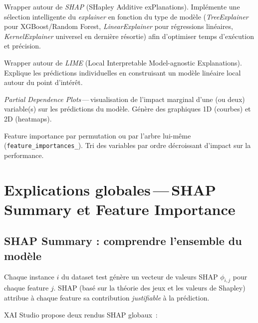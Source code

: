 \documentclass[11pt,a4paper]{report}
\begin{document}
\begin{description}[font=\sffamily\bfseries\color{accent}]
    \item[\texttt{shap\_explainer.py}]
        Wrapper autour de \textit{SHAP} (SHapley Additive exPlanations).
        Impl\'emente une s\'election intelligente du \textit{explainer}
        en fonction du type de mod\`ele (\textit{TreeExplainer} pour
        XGBoost/Random Forest, \textit{LinearExplainer} pour r\'egressions
        lin\'eaires, \textit{KernelExplainer} universel en derni\`ere
        r\'esortie) afin d'optimiser temps d'ex\'ecution et pr\'ecision.

    \item[\texttt{lime\_explainer.py}]
        Wrapper autour de \textit{LIME} (Local Interpretable Model-agnostic
        Explanations). Explique les pr\'edictions individuelles en
        construisant un mod\`ele lin\'eaire local autour du point
        d'int\'er\^et.

    \item[\texttt{pdp\_explainer.py}]
        \textit{Partial Dependence Plots}\,---\,visualisation de l'impact
        marginal d'une (ou deux) variable(s) sur les pr\'edictions du
        mod\`ele. G\'en\`ere des graphiques 1D (courbes) et 2D (heatmaps).

    \item[\texttt{feature\_importance.py}]
        Feature importance par permutation ou par l'arbre lui-m\^eme
        (\texttt{feature\_importances\_}). Tri des variables par ordre
        d\'ecroissant d'impact sur la performance.
\end{description}

\section{Explications globales\,---\,SHAP Summary et Feature Importance}

\subsection{SHAP Summary : comprendre l'ensemble du mod\`ele}

Chaque instance $i$ du dataset test g\'en\`ere un vecteur de valeurs SHAP
$\phi_{i,j}$ pour chaque feature $j$. SHAP (bas\'e sur la th\'eorie
des jeux et les valeurs de Shapley) attribue \`a chaque feature sa
contribution \textit{justifiable} \`a la pr\'ediction.

XAI Studio propose deux rendus SHAP globaux~:
\end{document}
